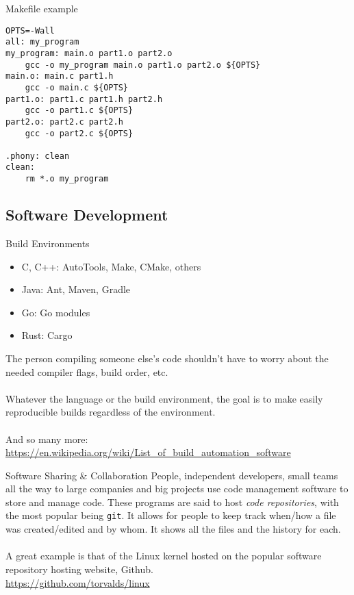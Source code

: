 \documentclass[graphics]{beamer}
\begin{document}
\begin{frame}[fragile]{Makefile example}
\begin{verbatim}
OPTS=-Wall
all: my_program
my_program: main.o part1.o part2.o
    gcc -o my_program main.o part1.o part2.o ${OPTS}
main.o: main.c part1.h
    gcc -o main.c ${OPTS}
part1.o: part1.c part1.h part2.h
    gcc -o part1.c ${OPTS}
part2.o: part2.c part2.h
    gcc -o part2.c ${OPTS}

.phony: clean
clean:
    rm *.o my_program
\end{verbatim}
\end{frame}

\subsection{Software Development}
\begin{frame}{Build Environments}
    \begin{itemize}
        \item C, C++: AutoTools, Make, CMake, others
        \item Java: Ant, Maven, Gradle
        \item Go: Go modules
        \item Rust: Cargo
    \end{itemize}
    The person compiling someone else’s code shouldn't have to worry about the needed compiler flags, build order, etc.
    \\ ~~ \\
    Whatever the language or the build environment, the goal is to make easily reproducible builds regardless of the environment.
    \\ ~~ \\
    \footnotesize
    And so many more: \url{https://en.wikipedia.org/wiki/List\_of\_build\_automation\_software}
\end{frame}

\begin{frame}{Software Sharing \& Collaboration}
    People, independent developers, small teams all the way to large companies and big projects use code management software to store and manage code.  These programs are said to host \textit{code repositories}, with the most popular being \texttt{git}. It allows for people to keep track when/how a file was created/edited and by whom. It shows all the files and the history for each.
    \\ ~~ \\
    A great example is that of the Linux kernel hosted on the popular software repository hosting website, Github. \\
    \url{https://github.com/torvalds/linux}
\end{frame}
\end{document}
